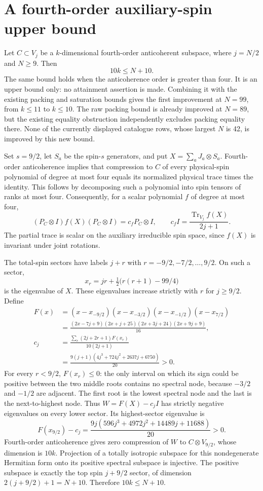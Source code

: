 \documentclass{article}
\begin{document}
\section*{A fourth-order auxiliary-spin upper bound}
Let $C\subset V_j$ be a $k$-dimensional fourth-order anticoherent
subspace, where $j=N/2$ and $N\ge9$. Then
\[
\boxed{10k\le N+10.}
\]
The same bound holds when the anticoherence order is greater than four.
It is an upper bound only: no attainment assertion is made.
Combining it with the existing packing and saturation bounds gives the
first improvement at $N=99$, from $k\le11$ to $k\le10$.
The raw packing bound is already improved at $N=89$, but the existing
equality obstruction independently excludes packing equality there.
None of the currently displayed catalogue rows, whose largest $N$ is 42,
is improved by this new bound.

Set $s=9/2$, let $S_a$ be the spin-$s$ generators, and put
$X=\sum_aJ_a\otimes S_a$. Fourth-order anticoherence implies that
compression to $C$ of every physical-spin polynomial of degree at most
four equals its normalized physical trace times the identity. This follows
by decomposing such a polynomial into spin tensors of ranks at most four.
Consequently, for a scalar polynomial $f$ of degree at most four,
\[
(P_C\otimes I)f(X)(P_C\otimes I)=c_f P_C\otimes I,
\qquad
c_f I=\frac{\operatorname{Tr}_{V_j} f(X)}{2j+1}.
\]
The partial trace is scalar on the auxiliary irreducible spin space, since
$f(X)$ is invariant under joint rotations.

The total-spin sectors have labels $j+r$ with
$r=-9/2,-7/2,\ldots,9/2$. On such a sector,
\[
x_r=jr+\tfrac12\bigl(r(r+1)-99/4\bigr)
\]
is the eigenvalue of $X$. These eigenvalues increase strictly with $r$
for $j\ge9/2$. Define
\begin{align*}
F(x)&=(x-x_{-9/2})(x-x_{-3/2})(x-x_{-1/2})(x-x_{7/2})\\
&=\frac{(2x-7j+9)(2x+j+25)(2x+3j+24)(2x+9j+9)}{16},\\
c_j&=\frac{\sum_r(2j+2r+1)F(x_r)}{10(2j+1)}\\
&=\frac{9(j+1)(4j^3+724j^2+2637j+6750)}{20}>0.
\end{align*}
For every $r<9/2$, $F(x_r)\le0$: the only interval on which its
sign could be positive between the two middle roots contains no spectral
node, because $-3/2$ and $-1/2$ are adjacent. The first root is the lowest
spectral node and the last is the next-to-highest node. Thus
$W=F(X)-c_jI$ has strictly negative eigenvalues on every lower sector.
Its highest-sector eigenvalue is
\[
F(x_{9/2})-c_j=
\frac{9j(596j^3+4972j^2+14489j+11688)}{20}>0.
\]
Fourth-order anticoherence gives zero compression of $W$ to
$C\otimes V_{9/2}$, whose dimension is $10k$. Projection of a totally
isotropic subspace for this nondegenerate Hermitian form onto its positive
spectral subspace is injective. The positive subspace is exactly the top
spin $j+9/2$ sector, of dimension $2(j+9/2)+1=N+10$.
Therefore $10k\le N+10$.
\end{document}
